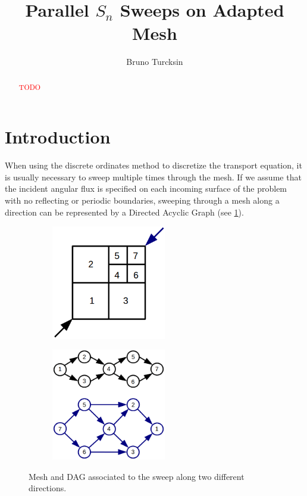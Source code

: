 \documentclass[letterpaper]{article}
\newcommand\red{\textcolor{red}}
\renewcommand{\(}{\left(}
\renewcommand{\)}{\right)}
\renewcommand{\[}{\left[}
\renewcommand{\]}{\right]}
\begin{document}
\title{Parallel $S_n$ Sweeps on Adapted Mesh}
\author{Bruno Turcksin} 
\date{}
\maketitle

\begin{abstract}
  \red{TODO}
\end{abstract}

\section{Introduction}
When using the discrete ordinates method to discretize the transport equation,
it is usually necessary to sweep multiple times through the mesh. If we assume 
that the incident angular flux is specified on each incoming surface of the
problem with no reflecting or periodic boundaries, sweeping through a mesh along
a direction can be represented by a Directed Acyclic Graph (see \cref{tasks}).
\begin{figure}[H]
  \begin{subfigure}[b]{.5\textwidth}
    \centering
    \includegraphics[width=5cm]{task_1}
  \end{subfigure}
  \begin{subfigure}[b]{.5\textwidth}
    \centering
    \includegraphics[width=5cm]{task_2}
  \end{subfigure}
  \caption{Mesh and DAG associated to the sweep along two different directions.}
  \label{tasks}
\end{figure}
\end{document}
